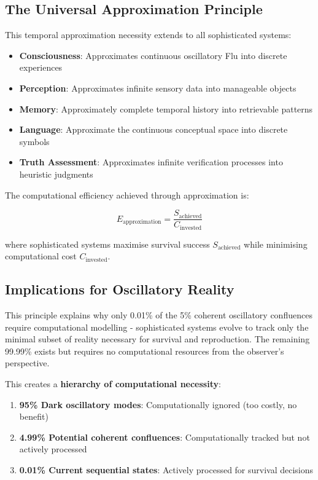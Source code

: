 \documentclass[11pt]{article}
\theoremstyle{remark}
\begin{document}
\subsection{The Universal Approximation Principle}

This temporal approximation necessity extends to all sophisticated systems:

\begin{itemize}
\item \textbf{Consciousness}: Approximates continuous oscillatory Flu into discrete experiences
\item \textbf{Perception}: Approximates infinite sensory data into manageable objects
\item \textbf{Memory}: Approximately complete temporal history into retrievable patterns
\item \textbf{Language}: Approximate the continuous conceptual space into discrete symbols
\item \textbf{Truth Assessment}: Approximates infinite verification processes into heuristic judgments
\end{itemize}

The computational efficiency achieved through approximation is:

$$E_{\text{approximation}} = \frac{S_{\text{achieved}}}{C_{\text{invested}}}$$

where sophisticated systems maximise survival success $S_{\text{achieved}}$ while minimising computational cost $C_{\text{invested}}$.

\subsection{Implications for Oscillatory Reality}

This principle explains why only 0.01\% of the 5\% coherent oscillatory confluences require computational modelling - sophisticated systems evolve to track only the minimal subset of reality necessary for survival and reproduction. The remaining 99.99\% exists but requires no computational resources from the observer's perspective.

This creates a \textbf{hierarchy of computational necessity}:
\begin{enumerate}
\item \textbf{95\% Dark oscillatory modes}: Computationally ignored (too costly, no benefit)
\item \textbf{4.99\% Potential coherent confluences}: Computationally tracked but not actively processed
\item \textbf{0.01\% Current sequential states}: Actively processed for survival decisions
\end{enumerate}
\end{document}
